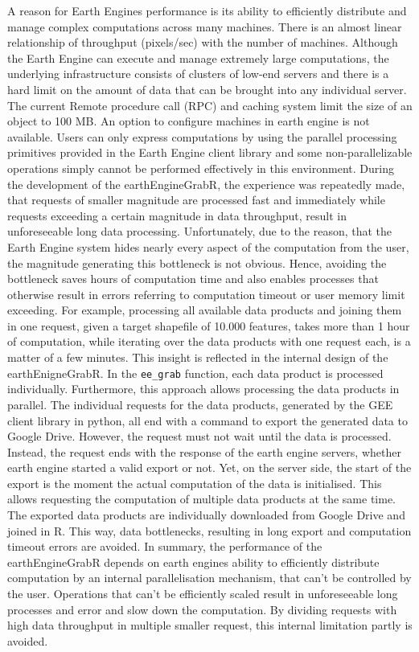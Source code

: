 \documentclass[11pt,twoside,a4paper,final]{report}
\begin{document}
A reason for Earth Engines performance is its ability to efficiently distribute and manage complex computations across many machines. There is an almost linear relationship of throughput (pixels/sec) with the number of machines.
Although the Earth Engine can execute and manage extremely large computations, the underlying infrastructure consists of clusters of low-end servers and there is a hard limit on the amount of data that can be brought into any individual server. The current Remote procedure call (RPC) and caching system limit the size of an object to 100 MB.
An option to configure machines in earth engine is not available.
Users can only express computations by using the parallel processing primitives provided in the Earth Engine client library and some non-parallelizable operations simply cannot be performed effectively in this environment.
During the development of the earthEngineGrabR, the experience was repeatedly made, that requests of smaller magnitude are processed fast and immediately while requests exceeding a certain magnitude in data throughput, result in unforeseeable long data processing. Unfortunately, due to the reason, that the Earth Engine system hides nearly every aspect of the computation from the user, the magnitude generating this bottleneck is not obvious. Hence, avoiding the bottleneck saves hours of computation time and also enables processes that otherwise result in errors referring to computation timeout or user memory limit exceeding. For example, processing all available data products and joining them in one request, given a target shapefile of 10.000 features, takes more than 1 hour of computation, while iterating over the data products with one request each, is a matter of a few minutes. This insight is reflected in the internal design of the earthEnigneGrabR. In the \texttt{ee\_grab} function, each data product is processed individually. Furthermore, this approach allows processing the data products in parallel. The individual requests for the data products, generated by the GEE client library in python, all end with a command to export the generated data to Google Drive. However, the request must not wait until the data is processed. Instead, the request ends with the response of the earth engine servers, whether earth engine started a valid export or not. Yet, on the server side, the start of the export is the moment the actual computation of the data is initialised. This allows requesting the computation of multiple data products at the same time. The exported data products are individually downloaded from Google Drive and joined in R. This way, data bottlenecks, resulting in long export and computation timeout errors are avoided. 
In summary, the performance of the earthEngineGrabR depends on earth engines ability to efficiently distribute computation by an internal parallelisation mechanism, that can't be controlled by the user. Operations that can't be efficiently scaled result in unforeseeable long processes and error and slow down the computation. By dividing requests with high data throughput in multiple smaller request, this internal limitation partly is avoided.
\end{document}
